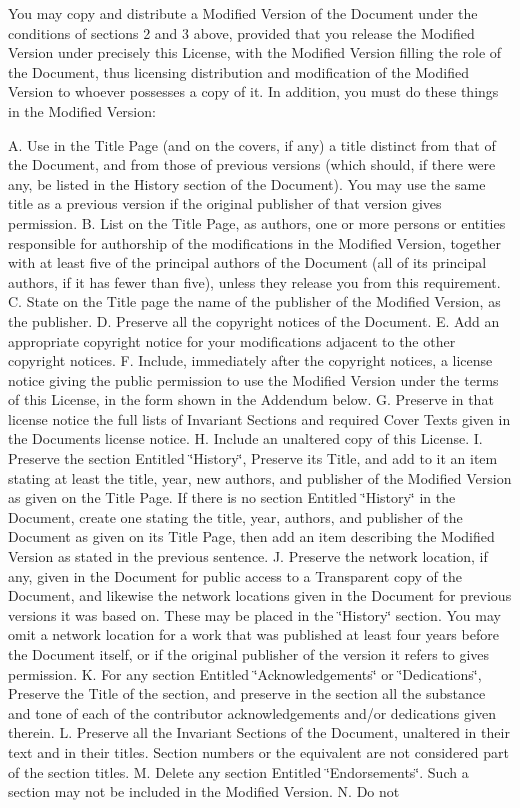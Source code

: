 You may copy and distribute a Modified Version of the Document under the conditions of sections 2 and 3 above, provided that you release the Modified Version under precisely this License, with the Modified Version filling the role of the Document, thus licensing distribution and modification of the Modified Version to whoever possesses a copy of it. In addition, you must do these things in the Modified Version\+:

A. Use in the Title Page (and on the covers, if any) a title distinct from that of the Document, and from those of previous versions (which should, if there were any, be listed in the History section of the Document). You may use the same title as a previous version if the original publisher of that version gives permission. B. List on the Title Page, as authors, one or more persons or entities responsible for authorship of the modifications in the Modified Version, together with at least five of the principal authors of the Document (all of its principal authors, if it has fewer than five), unless they release you from this requirement. C. State on the Title page the name of the publisher of the Modified Version, as the publisher. D. Preserve all the copyright notices of the Document. E. Add an appropriate copyright notice for your modifications adjacent to the other copyright notices. F. Include, immediately after the copyright notices, a license notice giving the public permission to use the Modified Version under the terms of this License, in the form shown in the Addendum below. G. Preserve in that license notice the full lists of Invariant Sections and required Cover Texts given in the Document\textquotesingle{}s license notice. H. Include an unaltered copy of this License. I. Preserve the section Entitled \char`\"{}\+History\char`\"{}, Preserve its Title, and add to it an item stating at least the title, year, new authors, and publisher of the Modified Version as given on the Title Page. If there is no section Entitled \char`\"{}\+History\char`\"{} in the Document, create one stating the title, year, authors, and publisher of the Document as given on its Title Page, then add an item describing the Modified Version as stated in the previous sentence. J. Preserve the network location, if any, given in the Document for public access to a Transparent copy of the Document, and likewise the network locations given in the Document for previous versions it was based on. These may be placed in the \char`\"{}\+History\char`\"{} section. You may omit a network location for a work that was published at least four years before the Document itself, or if the original publisher of the version it refers to gives permission. K. For any section Entitled \char`\"{}\+Acknowledgements\char`\"{} or \char`\"{}\+Dedications\char`\"{}, Preserve the Title of the section, and preserve in the section all the substance and tone of each of the contributor acknowledgements and/or dedications given therein. L. Preserve all the Invariant Sections of the Document, unaltered in their text and in their titles. Section numbers or the equivalent are not considered part of the section titles. M. Delete any section Entitled \char`\"{}\+Endorsements\char`\"{}. Such a section may not be included in the Modified Version. N. Do not 